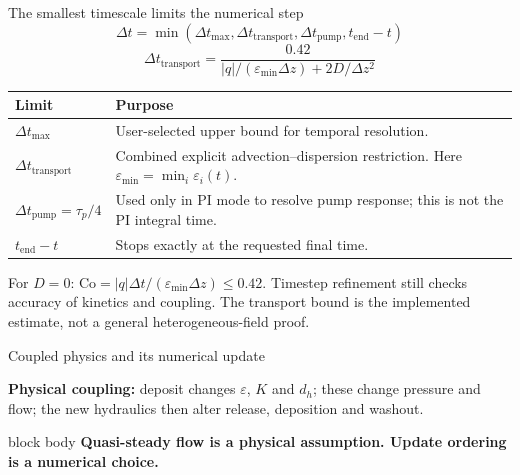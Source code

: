 \documentclass[aspectratio=169,11pt]{beamer}
\newcommand{\takeaway}[1]{%
  \begin{beamercolorbox}[rounded=true,sep=.55em]{block body}
    \centering\color{tumdark}\textbf{#1}
  \end{beamercolorbox}}
\begin{document}
\begin{frame}{The smallest timescale limits the numerical step}
\small
\[
\Delta t=\min\left(\Delta t_{\max},\Delta t_{\mathrm{transport}},
\Delta t_{\mathrm{pump}},t_{\mathrm{end}}-t\right)
\]
\[\Delta t_{\mathrm{transport}}=\frac{0.42}{|q|/(\varepsilon_{\min}\Delta z)+2D/\Delta z^2}\]
\begin{tabular}{p{3.5cm}p{8cm}}
\toprule
Limit & Purpose\\\midrule
$\Delta t_{\max}$ & User-selected upper bound for temporal resolution.\\[.5em]
$\Delta t_{\mathrm{transport}}$ & Combined explicit advection--dispersion restriction. Here $\varepsilon_{\min}=\min_i\varepsilon_i(t)$.\\[.5em]
$\Delta t_{\mathrm{pump}}=\tau_p/4$ & Used only in PI mode to resolve pump response; this is not the PI integral time.\\[.5em]
$t_{\mathrm{end}}-t$ & Stops exactly at the requested final time.\\\bottomrule
\end{tabular}
\vfill\small For $D=0$: $\mathrm{Co}=|q|\Delta t/(\varepsilon_{\min}\Delta z)\leq0.42$.
Timestep refinement still checks accuracy of kinetics and coupling. The transport bound is the implemented estimate, not a general heterogeneous-field proof.
\end{frame}

\begin{frame}{Coupled physics and its numerical update}
 \vspace{.25cm}
 \centering
 \vspace{.35cm}
 \par\vspace{.15cm}
 \small\centering \textbf{Physical coupling:} deposit changes $\varepsilon$, $K$ and $d_h$; these change pressure and flow; the new hydraulics then alter release, deposition and washout.
 \takeaway{Quasi-steady flow is a physical assumption. Update ordering is a numerical choice.}
\end{frame}
\end{document}
